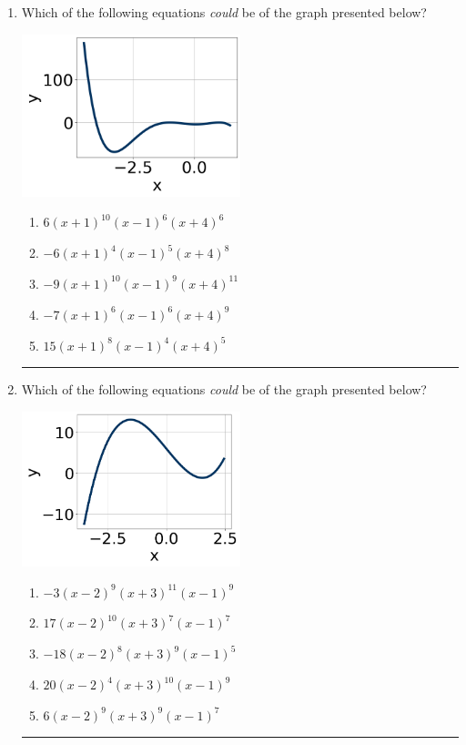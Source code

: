 \documentclass[14pt]{extbook}
\newcommand{\litem}[1]{\item#1\hspace*{-1cm}\rule{\textwidth}{0.4pt}}
\begin{document}
\begin{enumerate}
{\begin{enumerate}[label=\Alph*.]
\end{enumerate} }
\litem{
Which of the following equations \textit{could} be of the graph presented below?
\begin{center}
    \includegraphics[width=0.5\textwidth]{../Figures/polyGraphToFunctionCopyB.png}
\end{center}
\begin{enumerate}[label=\Alph*.]
\item \( 6(x + 1)^{10} (x - 1)^{6} (x + 4)^{6} \)
\item \( -6(x + 1)^{4} (x - 1)^{5} (x + 4)^{8} \)
\item \( -9(x + 1)^{10} (x - 1)^{9} (x + 4)^{11} \)
\item \( -7(x + 1)^{6} (x - 1)^{6} (x + 4)^{9} \)
\item \( 15(x + 1)^{8} (x - 1)^{4} (x + 4)^{5} \)

\end{enumerate} }
\litem{
Which of the following equations \textit{could} be of the graph presented below?
\begin{center}
    \includegraphics[width=0.5\textwidth]{../Figures/polyGraphToFunctionB.png}
\end{center}
\begin{enumerate}[label=\Alph*.]
\item \( -3(x - 2)^{9} (x + 3)^{11} (x - 1)^{9} \)
\item \( 17(x - 2)^{10} (x + 3)^{7} (x - 1)^{7} \)
\item \( -18(x - 2)^{8} (x + 3)^{9} (x - 1)^{5} \)
\item \( 20(x - 2)^{4} (x + 3)^{10} (x - 1)^{9} \)
\item \( 6(x - 2)^{9} (x + 3)^{9} (x - 1)^{7} \)


\end{enumerate}}
\end{enumerate}
\end{document}
